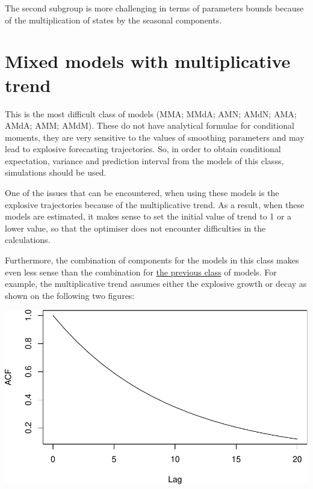 \documentclass[
]{book}
\theoremstyle{definition}
\theoremstyle{definition}
\theoremstyle{definition}
\theoremstyle{definition}
\theoremstyle{remark}
\begin{document}
The second subgroup is more challenging in terms of parameters bounds because of the multiplication of states by the seasonal components.

\hypertarget{ADAMETSMixedModelsGroup4}{%
\section{Mixed models with multiplicative trend}\label{ADAMETSMixedModelsGroup4}}

This is the most difficult class of models (MMA; MMdA; AMN; AMdN; AMA; AMdA; AMM; AMdM). These do not have analytical formulae for conditional moments, they are very sensitive to the values of smoothing parameters and may lead to explosive forecasting trajectories. So, in order to obtain conditional expectation, variance and prediction interval from the models of this classs, simulations should be used.

One of the issues that can be encountered, when using these models is the explosive trajectories because of the multiplicative trend. As a result, when these models are estimated, it makes sense to set the initial value of trend to 1 or a lower value, so that the optimiser does not encounter difficulties in the calculations.

Furthermore, the combination of components for the models in this class makes even less sense than the combination for \protect\hyperlink{ADAMETSMixedModelsGroup3}{the previous class} of models. For example, the multiplicative trend assumes either the explosive growth or decay as shown on the following two figures:

\includegraphics{adam_files/figure-latex/unnamed-chunk-45-1.pdf}
\end{document}
